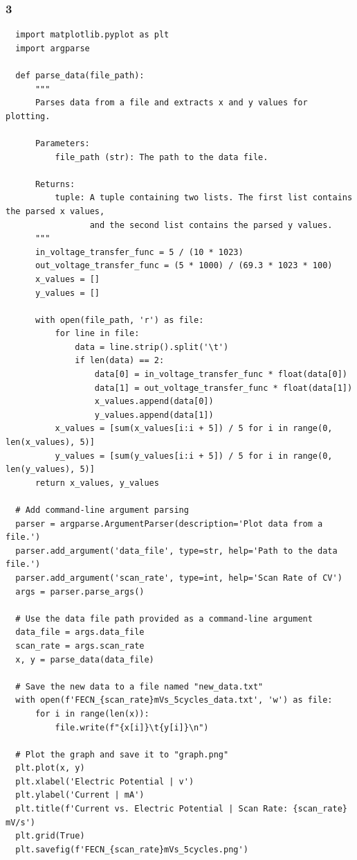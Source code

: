 \documentclass{article}
\begin{document}
\subsubsection*{3}
\begin{lstlisting}
  import matplotlib.pyplot as plt
  import argparse
  
  def parse_data(file_path):
      """
      Parses data from a file and extracts x and y values for plotting.
  
      Parameters:
          file_path (str): The path to the data file.
  
      Returns:
          tuple: A tuple containing two lists. The first list contains the parsed x values,
                 and the second list contains the parsed y values.
      """
      in_voltage_transfer_func = 5 / (10 * 1023)
      out_voltage_transfer_func = (5 * 1000) / (69.3 * 1023 * 100)
      x_values = []
      y_values = []
  
      with open(file_path, 'r') as file:
          for line in file:
              data = line.strip().split('\t')
              if len(data) == 2:
                  data[0] = in_voltage_transfer_func * float(data[0])
                  data[1] = out_voltage_transfer_func * float(data[1])
                  x_values.append(data[0])
                  y_values.append(data[1])
          x_values = [sum(x_values[i:i + 5]) / 5 for i in range(0, len(x_values), 5)]
          y_values = [sum(y_values[i:i + 5]) / 5 for i in range(0, len(y_values), 5)]
      return x_values, y_values
  
  # Add command-line argument parsing
  parser = argparse.ArgumentParser(description='Plot data from a file.')
  parser.add_argument('data_file', type=str, help='Path to the data file.')
  parser.add_argument('scan_rate', type=int, help='Scan Rate of CV')
  args = parser.parse_args()
  
  # Use the data file path provided as a command-line argument
  data_file = args.data_file
  scan_rate = args.scan_rate
  x, y = parse_data(data_file)
  
  # Save the new data to a file named "new_data.txt"
  with open(f'FECN_{scan_rate}mVs_5cycles_data.txt', 'w') as file:
      for i in range(len(x)):
          file.write(f"{x[i]}\t{y[i]}\n")
  
  # Plot the graph and save it to "graph.png"
  plt.plot(x, y)
  plt.xlabel('Electric Potential | v')
  plt.ylabel('Current | mA')
  plt.title(f'Current vs. Electric Potential | Scan Rate: {scan_rate} mV/s')
  plt.grid(True)
  plt.savefig(f'FECN_{scan_rate}mVs_5cycles.png')
  
\end{lstlisting}
\end{document}

